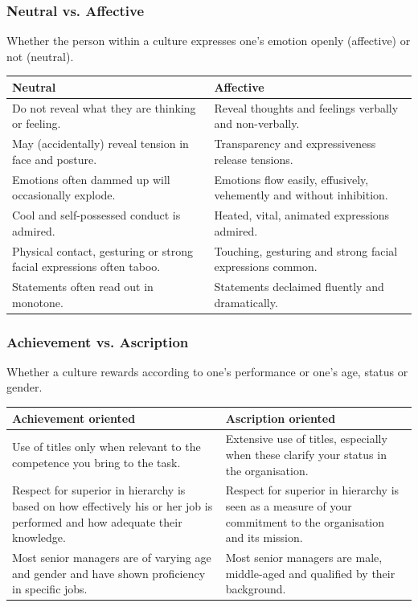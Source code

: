 \subsubsection{Neutral vs. Affective}
Whether the person within a culture expresses one's emotion openly (affective) or not (neutral).

\begin{tabularx}{\textwidth}{X|X}
	Neutral & Affective \\ 
	\hline 
	Do not reveal what they are thinking or	feeling. & Reveal thoughts and feelings verbally and non-verbally. \\ 
	May (accidentally) reveal tension in face and posture. & Transparency and expressiveness release tensions. \\ 
	Emotions often dammed up will occasionally explode. & Emotions flow easily, effusively, vehemently and without inhibition. \\ 
	Cool and self-possessed conduct is admired. & Heated, vital, animated expressions admired. \\ 
	Physical contact, gesturing or strong facial expressions often taboo. & Touching, gesturing and strong facial expressions common. \\
	Statements often read out in monotone. & Statements declaimed fluently and dramatically. \\
\end{tabularx}

\subsubsection{Achievement vs. Ascription}
Whether a culture rewards according to one's performance or one's age, status or gender.

\begin{tabularx}{\textwidth}{X|X}
	Achievement oriented & Ascription oriented \\ 
	\hline 
	Use of titles only when relevant to the competence you bring to the task. & Extensive use of titles, especially when these clarify your status in the organisation. \\ 
	Respect for superior in hierarchy is based on how effectively his or her job is performed and how adequate their knowledge. & Respect for superior in hierarchy is seen as a measure of your commitment to the organisation and its mission. \\ 
	Most senior managers are of varying age and	gender and have shown proficiency in specific	jobs. & Most senior managers are male, middle-aged and qualified by their background. \\ 
\end{tabularx}

